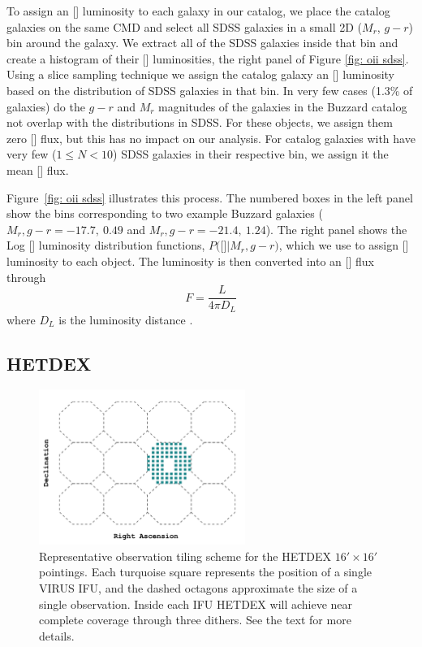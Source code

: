To assign an \hbox{[]} luminosity to each galaxy in our catalog, we place the catalog galaxies on the same CMD and select all SDSS galaxies in a small 2D ($M_r$, $g-r$) bin around the galaxy. We extract all of the SDSS galaxies inside that bin and create a histogram of their \hbox{[]} luminosities, the right panel of Figure \ref{fig: oii sdss}. Using a slice sampling technique \citep{Neal1997} we assign the catalog galaxy an \hbox{[]} luminosity based on the distribution of SDSS galaxies in that bin. In very few cases (1.3\% of galaxies) do the $g-r$ and $M_r$ magnitudes of the galaxies in the Buzzard catalog not overlap with the distributions in SDSS. For these objects, we assign them zero \hbox{[]} flux, but this has no impact on our analysis. For catalog galaxies with have very few ($1\leq N<10$) SDSS galaxies in their respective bin, we assign it the mean \hbox{[]} flux. 

Figure~\ref{fig: oii sdss} illustrates this process. The numbered boxes in the left panel show the bins corresponding to two example Buzzard galaxies ($M_r, g-r = -17.7,~0.49$ and $M_r, g-r = -21.4,~1.24$). The right panel shows the Log \hbox{[]} luminosity distribution functions, $P($\hbox{[]}$| M_r, g-r)$, which we use to assign \hbox{[]} luminosity to each object. The luminosity is then converted into an \hbox{[]} flux through 
\begin{equation}
	F = \frac{L}{4\pi D_L}
\end{equation}
where $D_L$ is the luminosity distance .

\subsection{HETDEX}\label{sec: hetdex}
\begin{figure}[t]
	\begin{center}
		\includegraphics[width=0.6\textwidth]{figures1/pointings.pdf} 
	\end{center}
	\caption[HETDEX pointing strategy.]{Representative observation tiling scheme for the HETDEX $16' \times 16'$ pointings. Each turquoise square represents the position of a single VIRUS IFU, and the dashed octagons approximate the size of a single observation. Inside each IFU HETDEX will achieve near complete coverage through three dithers. See the text for more details.} 
	\label{fig: ifu layout} 
\end{figure}

